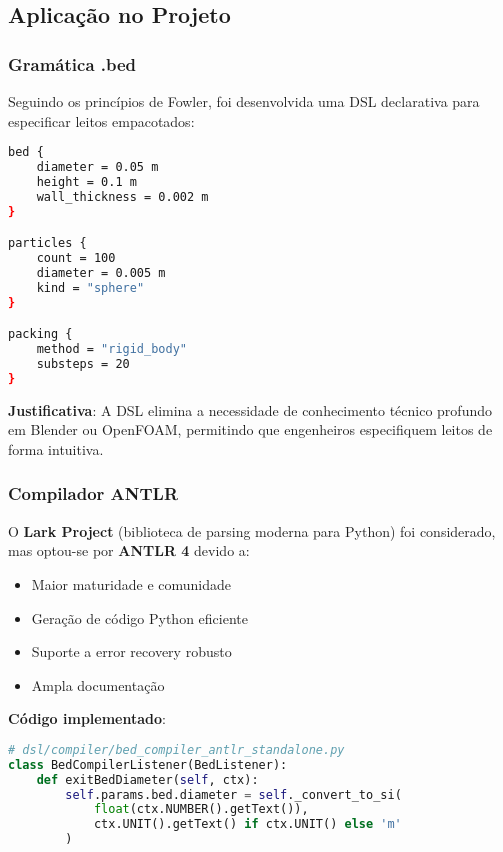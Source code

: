 \documentclass[12pt,a4paper]{article}
\begin{document}
\subsection{Aplicação no Projeto}

\subsubsection{Gramática .bed}

Seguindo os princípios de Fowler, foi desenvolvida uma DSL declarativa para especificar leitos empacotados:

\begin{lstlisting}[language=bash, caption=Exemplo de arquivo .bed]
bed {
    diameter = 0.05 m
    height = 0.1 m
    wall_thickness = 0.002 m
}

particles {
    count = 100
    diameter = 0.005 m
    kind = "sphere"
}

packing {
    method = "rigid_body"
    substeps = 20
}
\end{lstlisting}

\textbf{Justificativa}: A DSL elimina a necessidade de conhecimento técnico profundo em Blender ou OpenFOAM, permitindo que engenheiros especifiquem leitos de forma intuitiva.

\subsubsection{Compilador ANTLR}

O \textbf{Lark Project} (biblioteca de parsing moderna para Python) foi considerado, mas optou-se por \textbf{ANTLR 4} devido a:
\begin{itemize}
    \item Maior maturidade e comunidade
    \item Geração de código Python eficiente
    \item Suporte a error recovery robusto
    \item Ampla documentação
\end{itemize}

\textbf{Código implementado}:
\begin{lstlisting}[language=Python, caption=Compilador DSL com ANTLR]
# dsl/compiler/bed_compiler_antlr_standalone.py
class BedCompilerListener(BedListener):
    def exitBedDiameter(self, ctx):
        self.params.bed.diameter = self._convert_to_si(
            float(ctx.NUMBER().getText()),
            ctx.UNIT().getText() if ctx.UNIT() else 'm'
        )
\end{lstlisting}
\end{document}
